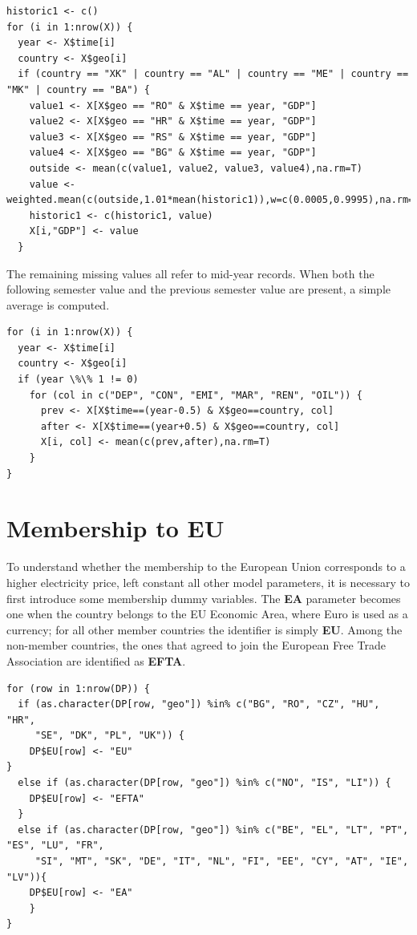 \documentclass{book}
\begin{document}
\begin{appendices}
\begin{verbatim}
historic1 <- c()
for (i in 1:nrow(X)) {
  year <- X$time[i]
  country <- X$geo[i]
  if (country == "XK" | country == "AL" | country == "ME" | country == "MK" | country == "BA") {
    value1 <- X[X$geo == "RO" & X$time == year, "GDP"]
    value2 <- X[X$geo == "HR" & X$time == year, "GDP"]
    value3 <- X[X$geo == "RS" & X$time == year, "GDP"]
    value4 <- X[X$geo == "BG" & X$time == year, "GDP"]
    outside <- mean(c(value1, value2, value3, value4),na.rm=T)
    value <- weighted.mean(c(outside,1.01*mean(historic1)),w=c(0.0005,0.9995),na.rm=T)
    historic1 <- c(historic1, value)
    X[i,"GDP"] <- value
  }
\end{verbatim}

The remaining missing values all refer to mid-year records. When both the following semester value and the previous semester value are present, a simple average is computed.

\begin{verbatim}
for (i in 1:nrow(X)) {
  year <- X$time[i]
  country <- X$geo[i]
  if (year \%\% 1 != 0)
    for (col in c("DEP", "CON", "EMI", "MAR", "REN", "OIL")) {
      prev <- X[X$time==(year-0.5) & X$geo==country, col]
      after <- X[X$time==(year+0.5) & X$geo==country, col]
      X[i, col] <- mean(c(prev,after),na.rm=T)
    }
}
\end{verbatim}

\section*{Membership to EU}

To understand whether the membership to the European Union corresponds to a higher electricity price, left constant all other model parameters, it is necessary to first introduce some membership dummy variables. The \textbf{EA} parameter becomes one when the country belongs to the EU Economic Area, where Euro is used as a currency; for all other member countries the identifier is simply \textbf{EU}. Among the non-member countries, the ones that agreed to join the European Free Trade Association are identified as \textbf{EFTA}.

\begin{verbatim}
for (row in 1:nrow(DP)) {
  if (as.character(DP[row, "geo"]) %in% c("BG", "RO", "CZ", "HU", "HR",
	 "SE", "DK", "PL", "UK")) {
    DP$EU[row] <- "EU"
}
  else if (as.character(DP[row, "geo"]) %in% c("NO", "IS", "LI")) {
    DP$EU[row] <- "EFTA"
  }
  else if (as.character(DP[row, "geo"]) %in% c("BE", "EL", "LT", "PT", "ES", "LU", "FR",
	 "SI", "MT", "SK", "DE", "IT", "NL", "FI", "EE", "CY", "AT", "IE", "LV")){
    DP$EU[row] <- "EA"
    }
}
\end{verbatim}


\end{appendices}
\end{document}
